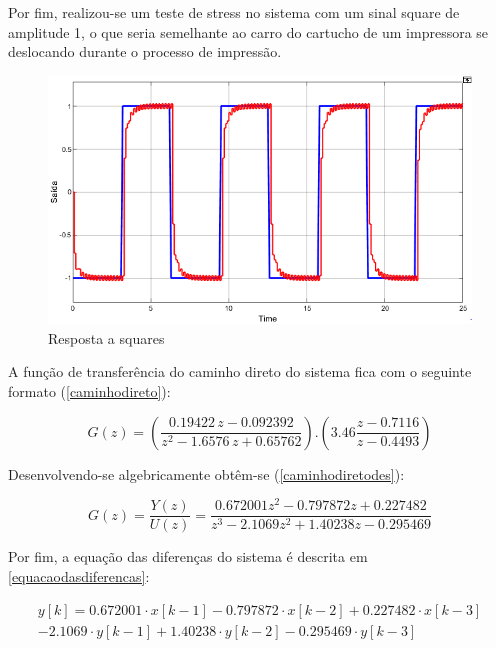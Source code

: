 \documentclass[a4paper,11pt]{article}
\begin{document}
Por fim, realizou-se um teste de stress no sistema com um sinal square de amplitude 1, o que seria semelhante ao carro do cartucho de um impressora se deslocando durante o processo de impressão.

\begin{figure}[H]
    \centering
    \includegraphics[width=\linewidth]{src/tex/img/teste_square.PNG}
    \caption{Resposta a squares}
    \label{fig:lgr}
\end{figure}

A função de transferência do caminho direto do sistema fica com o seguinte formato (\ref{caminhodireto}):

\begin{equation}
G(z)=(\frac{0.19422\,z-0.092392}{z^2-1.6576\,z+0.65762}) . (3.46\frac{z - 0.7116}{z - 0.4493})
\label{caminhodireto}
\end{equation}

Desenvolvendo-se algebricamente obtêm-se (\ref{caminhodiretodes}):

\begin{equation}
G(z)= \frac{Y(z)}{U(z)} = \frac{0.672001 z^{2}-0.797872 z+0.227482}{z^{3}-2.1069 z^{2}+1.40238 z-0.295469}
\label{caminhodiretodes}
\end{equation}

Por fim, a equação das diferenças do sistema é descrita em \ref{equacaodasdiferencas}:

\begin{equation}
\begin{split}
y[k]=0.672001 \cdot x[k-1]-0.797872 \cdot x[k-2]+0.227482 \cdot x[k-3] \\-2.1069 \cdot y[k-1]+1.40238 \cdot y[k-2]-0.295469 \cdot y[k-3]
\end{split}
\label{equacaodasdiferencas}
\end{equation}
\end{document}
